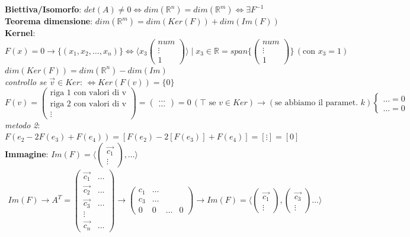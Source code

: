 \documentclass{article}
\begin{document}
\textbf{Biettiva/Isomorfo}: $det(A)\neq0 \iff dim(\mathbb{R}^n)=dim(\mathbb{R}^m) \iff \exists F^{-1} $ \\
\textbf{Teorema dimensione}: $dim(\mathbb{R}^m)=dim(Ker(F))+dim(Im(F))$ \\
\textbf{Kernel}: $F(x)=0 \to \{(x_1,x_2,\dots,x_n)\} \iff \langle x_3 \begin{pmatrix}
    num \\\vdots \\1 
\end{pmatrix}\rangle \mid x_3\in \mathbb{R}=span\{\begin{pmatrix}
    num \\\vdots \\1 
\end{pmatrix}\}\, (\text{con }x_3=1)$ \\
$dim(Ker(F))=dim(\mathbb{R}^n)-dim(Im)$ \\
\textit{controllo se $\vec{v}\in Ker$}: $\iff Ker(F(v))=\{0\}$\\
$F(v)=\begin{pmatrix}
    \text{riga 1 con valori di v}\\
    \text{riga 2 con valori di v}\\
    \vdots
\end{pmatrix}=\begin{pmatrix}
    \dots\\ \dots
\end{pmatrix}=0 \,(\top \text{ se } v\in Ker)\to (\text{se abbiamo il paramet. $k$})\begin{cases}
    \dots =0 \\
    \dots =0
\end{cases} $\\
\textit{metodo 2}: $F(e_2-2F(e_3)+F(e_4))=[F(e_2)-2[F(e_3)]+F(e_4)]=[\vdots]=[0]$\\
\textbf{Immagine}: $Im(F)=\langle \begin{pmatrix}
    \vec{c_1}\\\vdots
\end{pmatrix},\dots\rangle$ \\
\begin{align}
    Im(F) \to A^T=\begin{pmatrix}
        \vec{c_1} & \dots \\
        \vec{c_2} & \dots \\
        \vec{c_3} & \dots \\
        \vdots \\
        \vec{c_n} & \dots
    \end{pmatrix}\to \begin{pmatrix}
        c_1 & \dots \\
        c_3 & \dots \\
        0 & 0 & \dots & 0
    \end{pmatrix} \to Im(F)=\langle \begin{pmatrix}
    \vec{c_1}\\\vdots
\end{pmatrix},\begin{pmatrix}
    \vec{c_3}\\\vdots
\end{pmatrix}\dots\rangle
\end{align}
\end{document}
